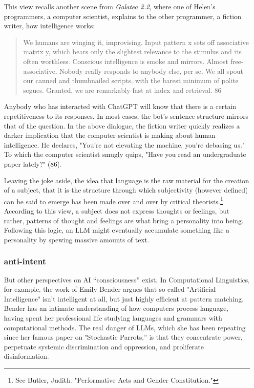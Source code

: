 \documentclass[11pt]{article}
\begin{document}
This view recalls another scene from \emph{Galatea 2.2}, where one of
Helen's programmers, a computer scientist, explains to the other
programmer, a fiction writer, how intelligence works:
\begin{quote}
We humans are winging it, improvising. Input pattern x sets off
associative matrix y, which bears only the slightest relevance to the
stimulus and its often worthless. Conscious intelligence is smoke and
mirrors. Almost free-associative. Nobody really responds to anybody
else, per se. We all spout our canned and thumbnailed scripts, with
the barest minimum of polite segues. Granted, we are remarkably fast
at index and retrieval. 86
\end{quote}
Anybody who has interacted with ChatGPT will know that there is a
certain repetitiveness to its responses. In most cases, the bot's
sentence structure mirrors that of the question. In the above
dialogue, the fiction writer quickly realizes a darker implication
that the computer scientist is making about human intelligence. He
declares, "You're not elevating the machine, you’re debasing us." To
which the computer scientist smugly quips, "Have you read an
undergraduate paper lately?" (86).

Leaving the joke aside, the idea that language is the raw material for
the creation of a subject, that it is the structure through which
subjectivity (however defined) can be said to emerge has been made
over and over by critical theorists.\footnote{See Butler, Judith. "Performative Acts and Gender
Constitution."} According to this view, a
subject does not express thoughts or feelings, but rather, patterns of
thought and feelings are what bring a personality into
being. Following this logic, an LLM might eventually accumulate
something like a personality by spewing massive amounts of text.

\subsubsection{anti-intent}
\label{sec:orgecf7cbd}
But other perspectives on AI “consciousness” exist. In Computational
Linguistics, for example, the work of Emily Bender argues that so
called "Artificial Intelligence" isn't intelligent at all, but just
highly efficient at pattern matching. Bender has an intimate
understanding of how computers process language, having spent her
professional life studying languages and grammars with computational
methods. The real danger of LLMs, which she has been repeating since
her famous paper on "Stochastic Parrots,” is that they concentrate
power, perpetuate systemic discrimination and oppression, and
proliferate disinformation.
\end{document}
